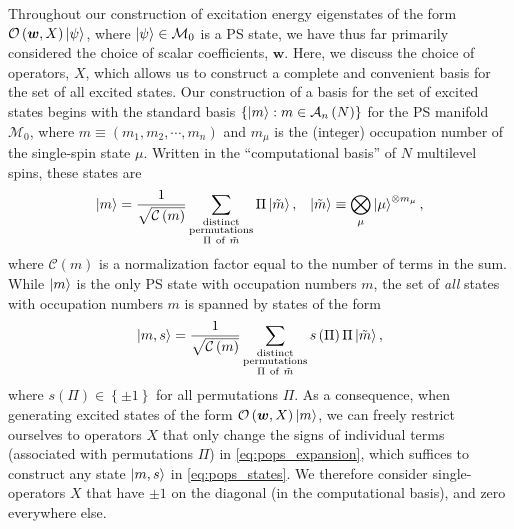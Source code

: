 \documentclass[nofootinbib,notitlepage,11pt]{revtex4-2}
\renewcommand{\t}{\text} %
\newcommand{\f}[2]{\dfrac{#1}{#2}} %
\newcommand{\p}[1]{\left(#1\right)} %
\renewcommand{\set}[1]{\left\{#1\right\}} %
\newcommand{\m}{\bm} %
\newcommand{\1}{\mathds{1}}
\newcommand{\A}{\mathcal{A}}
\newcommand{\C}{\mathcal{C}}
\newcommand{\M}{\mathcal{M}}
\renewcommand{\O}{\mathcal{O}}
\begin{document}
Throughout our construction of excitation energy eigenstates of the
form $\O\p{\m w,X}\ket\psi$, where $\ket\psi\in\M_0$ is a PS state, we
have thus far primarily considered the choice of scalar coefficients,
$\m w$.  Here, we discuss the choice of operators, $X$, which allows
us to construct a complete and convenient basis for the set of all
excited states.  Our construction of a basis for the set of excited
states begins with the standard basis $\set{\ket{m}:m\in\A_n\p{N}}$
for the PS manifold $\M_0$, where $m\equiv\p{m_1,m_2,\cdots,m_n}$ and
$m_\mu$ is the (integer) occupation number of the single-spin state
$\mu$.  Written in the ``computational basis'' of $N$ multilevel
spins, these states are
\begin{align}
  \ket{m} =
  \f1{\sqrt{\C\p{m}}}
  \sum_{\substack{\t{distinct}\\\t{permutations}\\\Pi~\t{of}~\tilde m}}
  \Pi \ket{\tilde m},
  &&
  \ket{\tilde m} \equiv \bigotimes_\mu \ket{\mu}^{\otimes m_\mu},
  \label{eq:pops_expansion}
\end{align}
where $\C\p{m}$ is a normalization factor equal to the number of terms
in the sum.  While $\ket{m}$ is the only PS state with occupation
numbers $m$, the set of {\it all} states with occupation numbers $m$
is spanned by states of the form
\begin{align}
  \ket{m,s} = \f1{\sqrt{\C\p{m}}}
  \sum_{\substack{\t{distinct}\\\t{permutations}\\\Pi~\t{of}~\tilde m}}
  s\p{\Pi} \Pi \ket{\tilde m},
  \label{eq:pops_states}
\end{align}
where $s\p{\Pi}\in\set{\pm1}$ for all permutations $\Pi$.  As a
consequence, when generating excited states of the form
$\O\p{\m w,X}\ket{m}$, we can freely restrict ourselves to operators
$X$ that only change the signs of individual terms (associated with
permutations $\Pi$) in \eqref{eq:pops_expansion}, which suffices to
construct any state $\ket{m,s}$ in \eqref{eq:pops_states}.  We
therefore consider single-operators $X$ that have $\pm1$ on the
diagonal (in the computational basis), and zero everywhere else.
\end{document}
